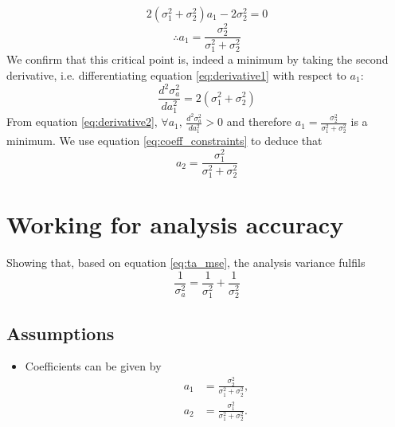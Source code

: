 \begin{equation*}
    2 \left( \sigma_1^2 + \sigma_2^2 \right) a_1 - 2 \sigma_2^2 = 0
\end{equation*}
\begin{equation}
\therefore a_1 = \frac{\sigma_2^2}{\sigma_1^2 + \sigma_2^2} \label{eq:result_a1}
\end{equation}
We confirm that this critical point is, indeed a minimum by taking the second derivative, i.e. differentiating equation \ref{eq:derivative1} with respect to $a_1$:
\begin{equation}
    \frac{d^2 \sigma_a^2}{da_1^2} = 2 \left( \sigma_1^2 + \sigma_2^2 \right) \label{eq:derivative2}
\end{equation}
From equation \ref{eq:derivative2}, $\forall a_1$, $\frac{d^2 \sigma_a^2}{da_1^2} > 0$ and therefore $a_1 = \frac{\sigma_2^2}{\sigma_1^2 + \sigma_2^2}$ is a minimum.
We use equation \ref{eq:coeff_constraints} to deduce that
\begin{equation}
    a_2 = \frac{\sigma_1^2}{\sigma_1^2 + \sigma_2^2} \label{eq:result_a2}
\end{equation}

\section{Working for analysis accuracy}
\label{sec:kalnay:analysis}
Showing that, based on equation \ref{eq:ta_mse}, the analysis variance fulfils
\begin{equation}
    \frac{1}{\sigma_a^2} = \frac{1}{\sigma_1^2} + \frac{1}{\sigma_2^2}
\end{equation}

\subsection{Assumptions}
\label{sub:analysis:assumptions}

\begin{itemize}
    \item Coefficients can be given by
    \begin{subequations}
        \begin{align}
            a_1 &= \frac{\sigma_2^2}{\sigma_1^2 + \sigma_2^2}, \\
            a_2 &= \frac{\sigma_1^2}{\sigma_1^2 + \sigma_2^2}.
        \end{align}
        \label{eq:coefficients_results}
    \end{subequations}
\end{itemize}

